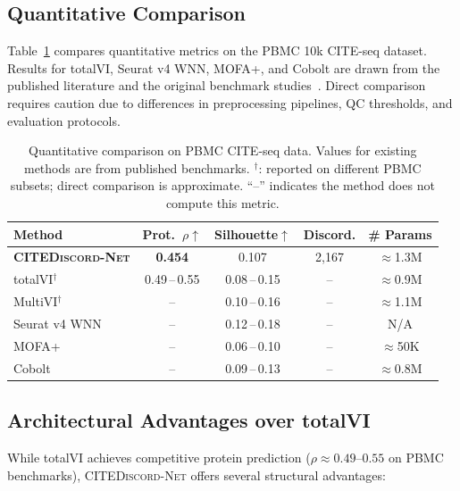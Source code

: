 \documentclass[11pt,a4paper]{article}
\newcommand{\citenet}{\textsc{CITEDiscord-Net}}
\begin{document}
\subsection{Quantitative Comparison}

Table~\ref{tab:quant_comparison} compares quantitative metrics on the PBMC 10k CITE-seq dataset.
Results for totalVI, Seurat v4 WNN, MOFA+, and Cobolt are drawn from the published literature and the original benchmark studies~\citep{gayoso2021, hao2021, argelaguet2020, gong2021}.
Direct comparison requires caution due to differences in preprocessing pipelines, QC thresholds, and evaluation protocols.

\begin{table}[!ht]
\centering
\caption{Quantitative comparison on PBMC CITE-seq data. Values for existing methods are from published benchmarks. $^\dagger$: reported on different PBMC subsets; direct comparison is approximate. ``--'' indicates the method does not compute this metric.}
\label{tab:quant_comparison}
\scriptsize
\begin{tabular}{l c c c c}
\toprule
\textbf{Method} & \textbf{Prot.\ $\rho$}$\uparrow$ & \textbf{Silhouette}$\uparrow$ & \textbf{Discord.} & \textbf{\# Params} \\
\midrule
\textbf{\citenet{}} & \textbf{0.454} & 0.107 & 2,167 & $\approx$1.3M \\
totalVI$^\dagger$~\citep{gayoso2021} & 0.49\,--\,0.55 & 0.08\,--\,0.15 & -- & $\approx$0.9M \\
MultiVI$^\dagger$~\citep{ashuach2023} & -- & 0.10\,--\,0.16 & -- & $\approx$1.1M \\
Seurat v4 WNN~\citep{hao2021} & -- & 0.12\,--\,0.18 & -- & N/A \\
MOFA+~\citep{argelaguet2020} & -- & 0.06\,--\,0.10 & -- & $\approx$50K \\
Cobolt~\citep{gong2021} & -- & 0.09\,--\,0.13 & -- & $\approx$0.8M \\
\bottomrule
\end{tabular}
\end{table}

\subsection{Architectural Advantages over totalVI}

While totalVI achieves competitive protein prediction ($\rho \approx 0.49$--$0.55$ on PBMC benchmarks), \citenet{} offers several structural advantages:
\end{document}
